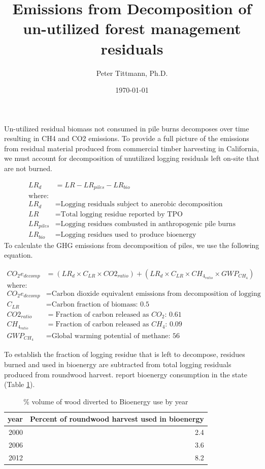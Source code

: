 \documentclass[a4paper]{article}
\author{Peter Tittmann, Ph.D.}
\date{\today}
\title{Emissions from Decomposition of un-utilized forest management residuals}
\begin{document}
\maketitle
\tableofcontents

Un-utilized residual biomass not consumed in pile burns decomposes over
time resulting in CH4  and CO2 emissions. To provide a
full picture of the emissions from residual material produced from
commercial timber harvesting in California, we must account for decomposition 
of unutilized logging residuals left on-site that are not burned. 

\begin{align*}
LR_d &= LR - LR_{piles} - LR_{bio} \\
\text{where:}\\
LR_d &= \text{Logging residuals subject to anerobic decomposition} \\
LR &= \text{Total logging residue reported by TPO}\\
LR_{piles} &= \text{Logging residues combusted in anthropogenic pile burns}\\
LR_{bio} &= \text{Logging residues used to produce bioenergy}
\end{align*}
To calculate the \ac{GHG} emissions from decomposition of piles, we use the
following equation.

\begin{align*}
CO_2e_{decomp} &= \left(LR_d \times C_{LR} \times CO2_{ratio} \right) + \left(LR_d \times C_{LR} \times CH_4_{ratio}\times GWP_{CH_4}\right)\\
\text{where:}\\
CO_2e_{decomp} &= \text{Carbon dioxide equivalent emissions from decomposition of logging slash}\\
C_{LR} &= \text{Carbon fraction of biomass: 0.5}\\
CO2_{ratio} &= \text{Fraction of carbon released as } CO_2\text{: 0.61}\\
CH_4_{ratio} &= \text{Fraction of carbon released as } CH_4\text{: 0.09}\\
GWP_{CH_4} &= \text{Global warming potential of methane: 56}
\end{align*}

To establish the fraction of logging residue that is left to decompose, residues burned and used in bioenergy are subtracted from total logging residuals produced from roundwood harvest. \cite{Mciver2012} report bioenergy consumption in the state (Table \ref{tab:bio_vol}).

\begin{table}[htb]
\centering
\begin{tabular}{rr}
year & Percent of roundwood harvest used in bioenergy\\
\hline
2000 & 2.4\\
2006 & 3.6\\
2012 & 8.2\\
\end{tabular}
\caption{\% volume of wood diverted to Bioenergy use by year \label{tab:bio_vol}}

\end{table}
\end{document}
